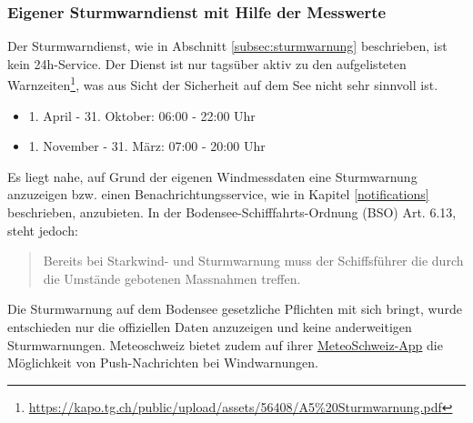 \subsubsection{Eigener Sturmwarndienst mit Hilfe der Messwerte}
Der Sturmwarndienst, wie in Abschnitt \ref{subsec:sturmwarnung} beschrieben, ist kein 24h-Service. Der Dienst ist nur tagsüber aktiv zu den aufgelisteten Warnzeiten\footnote{ \url{https://kapo.tg.ch/public/upload/assets/56408/A5\%20Sturmwarnung.pdf}}, was aus Sicht der Sicherheit auf dem See nicht sehr sinnvoll ist.

\begin{itemize}
\item 1. April - 31. Oktober: 06:00 - 22:00 Uhr
\item 1. November - 31. März: 07:00 - 20:00 Uhr
\end{itemize}

\noindent
Es liegt nahe, auf Grund der eigenen Windmessdaten eine Sturmwarnung anzuzeigen bzw. einen Benachrichtungsservice, wie in Kapitel \ref{notifications} beschrieben, anzubieten. In der Bodensee-Schifffahrts-Ordnung (BSO) Art. 6.13, steht jedoch:

\begin{quote}
\flqq Bereits bei Starkwind- und Sturmwarnung muss der Schiffsführer die durch die Umstände gebotenen Massnahmen treffen.\frqq
\end{quote}

\noindent
 Die Sturmwarnung auf dem Bodensee gesetzliche Pflichten mit sich bringt, wurde entschieden nur die offiziellen Daten anzuzeigen und keine anderweitigen Sturmwarnungen. Meteoschweiz bietet zudem auf ihrer  \href{https://www.meteoschweiz.admin.ch/home/service-und-publikationen/beratung-und-service/meteoschweiz-app.html}{MeteoSchweiz-App} die Möglichkeit von Push-Nachrichten bei Windwarnungen.







